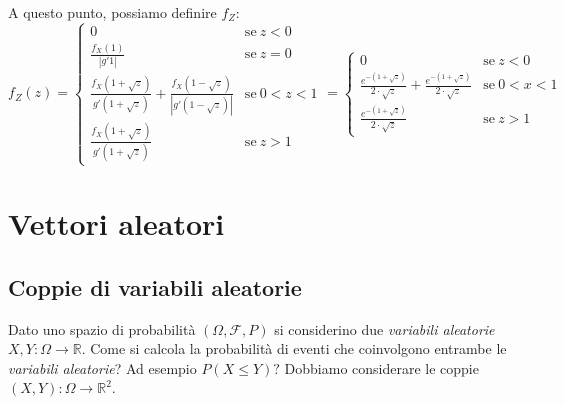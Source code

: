 \documentclass[12pt, a4paper]{report}
\theoremstyle{definition}
\DeclareRobustCommand{\F}{\mathcal{F}}%
\DeclareRobustCommand{\R}{\mathbb{R}}%
\DeclareRobustCommand{\probspace}{(\Omega,\F,P)}
\begin{document}
A questo punto, possiamo definire $f_Z$:
\[f_Z(z)=\begin{cases}
	{0} & \text{se}\ {z<0}\\
	{\frac{f_X(1)}{|g'{1}|}} & \text{se}\ {z=0}\\
	{\frac{f_X(1+\sqrt{z})}{g'(1+\sqrt{z})}+\frac{f_X(1-\sqrt{z})}{|g'(1-\sqrt{z})|}} & 
	\text{se}\ {0<z<1}\\
	{\frac{f_X(1+\sqrt{z})}{g'(1+\sqrt{z})}} & \text{se}\ {z>1}
\end{cases}=\begin{cases}
	{0} & \text{se}\ {z<0}\\
	{\frac{e^{-(1+\sqrt{z})}}{2\cdot \sqrt{z}}+\frac{e^{-(1+\sqrt{z})}}{2\cdot \sqrt{z}}} &
	\text{se}\ {0<x<1}\\
	{\frac{e^{-(1+\sqrt{z})}}{2\cdot \sqrt{z}}} & \text{se}\ {z>1}
\end{cases}\]

\begin{center}
\end{center}

\chapter{Vettori aleatori}

\section{Coppie di variabili aleatorie}
Dato uno spazio di probabilità $\probspace$ si considerino due \emph{
variabili aleatorie} \(X,Y:\Omega\rightarrow\R\). Come si calcola la probabilità
di eventi che coinvolgono entrambe le \emph{variabili aleatorie}? Ad esempio \(
P(X\leq Y)?\) Dobbiamo considerare le coppie \((X,Y):\Omega\rightarrow\R^2\).
\end{document}
